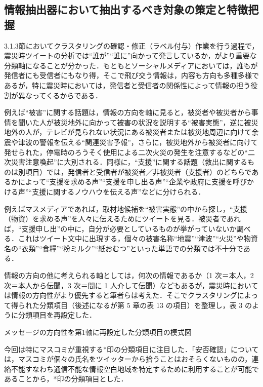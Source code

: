 \documentclass[japanese]{jnlp_1.4}
\begin{document}
\subsection{情報抽出器において抽出するべき対象の策定と特徴把握}

3.1.3節においてクラスタリングの確認・修正（ラベル付与）作業を行う過程で，震災時ツイートの分析では``誰が''``誰に''向かって発言しているか，がより重要な分類軸になることが分かった．もともとソーシャルメディアにおいては，誰もが発信者にも受信者にもなり得，そこで飛び交う情報は，内容も方向も多種多様であるが，特に震災時においては，発信者と受信者の関係性によって情報の担う役割が異なってくるからである．

例えば``被害''に関する話題は，情報の方向を軸に見ると，被災者や被災者から事情を聞いた人が被災地外に向かって被害の状況を説明する``被害実態''，逆に被災地外の人が，テレビが見られない状況にある被災者または被災地周辺に向けて余震や津波の警報を伝える``関連災害予報''，さらに，被災地外から被災者に向けて発せられた，停電時のろうそく使用による二次火災の発生を注意するなどの``二次災害注意喚起''に大別される．同様に，``支援''に関する話題（救出に関するものは別項目）では，発信者と受信者が被災者／非被災者（支援者）のどちらであるかによって``支援を求める声''``支援を申し出る声''``企業や政府に支援を呼びかける声''``支援に関するノウハウを伝える声''などに分けられる．

例えばマスメディアであれば，取材地候補を``被害実態''の中から探し，``支援（物資）を求める声''を人々に伝えるためにツイートを見る．被災者であれば，``支援申し出''の中に，自分が必要としているものが挙がっていないか調べる．これはツイート文中に出現する，個々の被害名称``地震''``津波''``火災''や物資名の``衣類''``食糧''``粉ミルク''``紙おむつ''といった単語での分類では不十分である．

情報の方向の他に考えられる軸としては，何次の情報であるか（1 次＝本人，2 次＝本人から伝聞，3 次＝間に 1 人介して伝聞）などもあるが，震災時においては情報の方向性がより優先すると筆者らは考えた．そこでクラスタリングによって得られた分類項目（後述になるが第 5 章の表 13 の項目）を整理し，表 3 のように分類項目を再設定した．

\begin{table}[b]
\caption{メッセージの方向性を第1軸に再設定した分類項目の模式図}

\end{table}

今回は特にマスコミが重視する*印の分類項目に注目した．「安否確認」については，マスコミが個々の氏名をツイッターから拾うことはおそらくないものの，連絡不能すなわち通信不能な情報空白地域を特定するために利用することが可能であることから，*印の分類項目とした．
\end{document}
